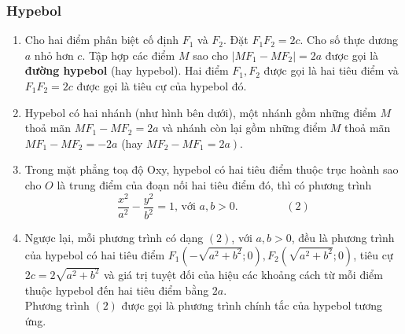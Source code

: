 \subsubsection{Hypebol}
\begin{enumerate}[-]
	\item Cho hai điểm phân biệt cố định $F_{1}$ và $F_{2}$. Đặt $F_{1} F_{2}=2 c$. Cho số thực dương $ a $ nhỏ hơn $ c $. Tập hợp các điểm $M$ sao cho $\left|M F_{1}-M F_{2}\right|=2 a$ được gọi là \textbf{đường hypebol} (hay hypebol). Hai điểm $F_{1}, F_{2}$ được gọi là hai tiêu điểm và $F_{1} F_{2}=2 c$ được gọi là tiêu cự của hypebol đó.
	\item Hypebol có hai nhánh (như hình bên dưới), một nhánh gồm những điểm $M$ thoả mãn $M F_{1}-M F_{2}=2 a$ và nhánh còn lại gồm những điểm $M$ thoả mãn $M F_{1}-M F_{2}=-2 a$ (hay $\left.M F_{2}-M F_{1}=2 a\right)$.
	\begin{center}
	\end{center}
	\item Trong mặt phẳng toạ độ Oxy, hypebol có hai tiêu điểm thuộc trục hoành sao cho $O$ là trung điểm của đoạn nối hai tiêu điểm đó, thì có phương trình
	$$
	\dfrac{x^{2}}{a^{2}}-\dfrac{y^{2}}{b^{2}}=1 \text {, với } a, b>0 \text {. } \quad  \quad \quad \quad (2)
	$$
	\item Ngược lại, mỗi phương trình có dạng $ (2) $, với $a, b>0$, đều là phương trình của hypebol có hai tiêu điểm $F_{1}\left(-\sqrt{a^{2}+b^{2}} ; 0\right), F_{2}\left(\sqrt{a^{2}+b^{2}} ; 0\right)$, tiêu cự $2 c=2 \sqrt{a^{2}+b^{2}}$ và giá trị tuyệt đối của hiệu các khoảng cách từ mỗi điểm thuộc hypebol đến hai tiêu điểm bằng $2 a$.\\ Phương trình $ (2) $ được gọi là phương trình chính tắc của hypebol tương ứng.
\end{enumerate}

